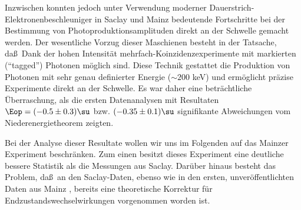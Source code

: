 Inzwischen konnten jedoch unter Verwendung moderner 
Dau\-er\-strich-Elek\-tro\-nen\-be\-schleu\-niger in Saclay \cite{Maz86} und
Mainz \cite{Bec90} bedeutende Fortschritte bei der Bestimmung von
Photoproduktionsamplituden direkt an der Schwelle gemacht werden. 
Der wesentliche Vorzug dieser Maschienen besteht in der Tatsache, 
da\ss\ Dank der hohen  Intensit\"at
mehrfach-Koinzidenzexperimente mit markierten (``tagged'')
Photonen m\"oglich sind. Diese Technik gestattet die Produktion von
Photonen mit sehr genau definierter Energie ($\sim 200$ keV) und 
erm\"oglicht pr\"azise Experimente direkt an der Schwelle. 
Es war daher eine betr\"achtliche \"Uberraschung, als die ersten 
Datenanalysen mit Resultaten $\Eop = (-0.5\pm 0.3) \su$ \cite{Maz86}
bzw. $(-0.35 \pm 0.1) \su$ \cite{Bec89} signifikante Abweichungen
vom Niederenergietheorem zeigten. 

Bei der Analyse dieser Resultate wollen wir uns im Folgenden auf 
das Mainzer Experiment \cite{Bec90,Str90} beschr\"anken. Zum
einen besitzt dieses Experiment eine deutliche bessere Statistik
als die Messungen aus Saclay. Dar\"uber hinaus besteht das Problem,
da\ss\ an den Saclay-Daten,
ebenso wie in den ersten, unver\"offentlichten Daten aus Mainz
\cite{Bec89}, bereits eine theoretische Korrektur f\"ur 
Endzustandswechselwirkungen vorgenommen worden ist.

